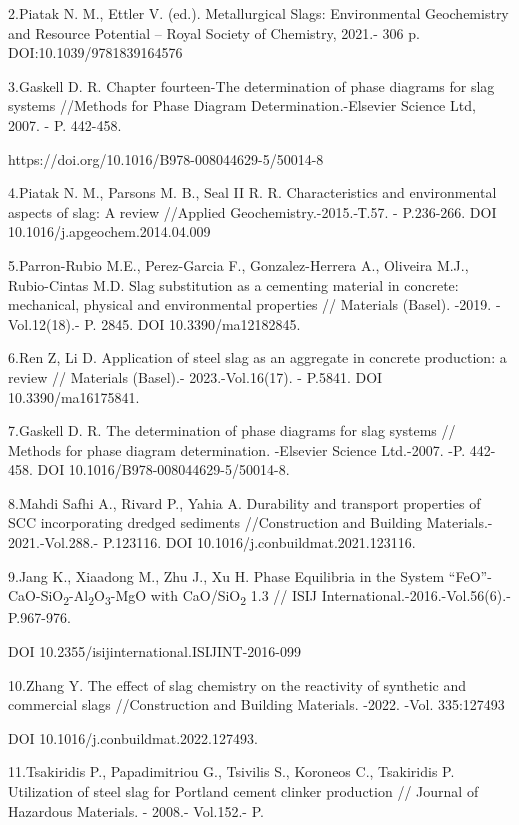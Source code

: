 2.Piatak N. M., Ettler V. (ed.). Metallurgical Slags: Environmental
Geochemistry and Resource Potential -- Royal Society of Chemistry,
2021.- 306 p. DOI:10.1039/9781839164576

3.Gaskell D. R. Chapter fourteen-The determination of phase diagrams for
slag systems //Methods for Phase Diagram Determination.-Elsevier Science
Ltd, 2007. - P. 442-458.

https://doi.org/10.1016/B978-008044629-5/50014-8

4.Piatak N. M., Parsons M. B., Seal II R. R. Characteristics and
environmental aspects of slag: A review //Applied
Geochemistry.-2015.-Т.57. - P.236-266. DOI
10.1016/j.apgeochem.2014.04.009

5.Parron-Rubio M.E., Perez-Garcia F., Gonzalez-Herrera A., Oliveira
M.J., Rubio-Cintas M.D. Slag substitution as a cementing material in
concrete: mechanical, physical and environmental properties // Materials
(Basel). -2019. - Vol.12(18).- P. 2845. DOI 10.3390/ma12182845.

6.Ren Z, Li D. Application of steel slag as an aggregate in concrete
production: a review // Materials (Basel).- 2023.-Vol.16(17). - P.5841.
DOI 10.3390/ma16175841.

7.Gaskell D. R. The determination of phase diagrams for slag systems //
Methods for phase diagram determination. -Elsevier Science Ltd.-2007.
-P. 442-458. DOI 10.1016/B978-008044629-5/50014-8.

8.Mahdi Safhi A., Rivard P., Yahia A. Durability and transport
properties of SCC incorporating dredged sediments //Construction and
Building Materials.- 2021.-Vol.288.- P.123116. DOI
10.1016/j.conbuildmat.2021.123116.

9.Jang K., Xiaadong M., Zhu J., Xu H. Phase Equilibria in the System
``FeO''-CaO-SiO\textsubscript{2}-Al\textsubscript{2}O\textsubscript{3}-MgO
with CaO/SiO\textsubscript{2} 1.3 // ISIJ
International.-2016.-Vol.56(6).-P.967-976.

DOI 10.2355/isijinternational.ISIJINT-2016-099

10.Zhang Y. The effect of slag chemistry on the reactivity of synthetic
and commercial slags //Construction and Building Materials. -2022. -Vol.
335:127493

DOI 10.1016/j.conbuildmat.2022.127493.

11.Tsakiridis P., Papadimitriou G., Tsivilis S., Koroneos C., Tsakiridis
P. Utilization of steel slag for Portland cement clinker production //
Journal of Hazardous Materials. - 2008.- Vol.152.- P.

